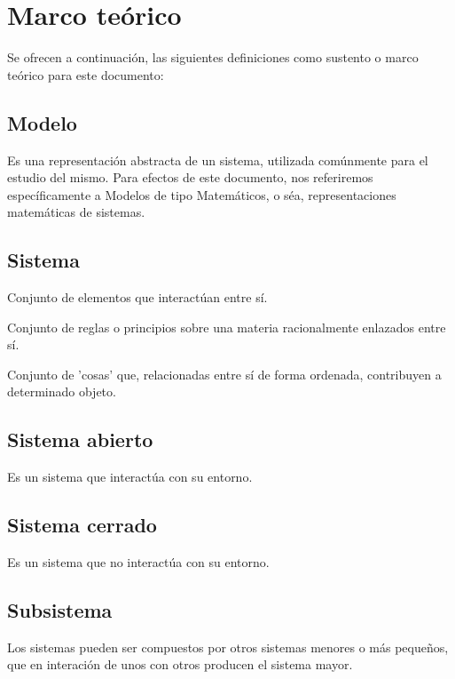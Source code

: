 \section{Marco teórico}
Se ofrecen a continuación, las siguientes definiciones como sustento o marco teórico para este documento:


\subsection{Modelo}
Es una representación abstracta de un sistema, utilizada comúnmente para el estudio del mismo. Para efectos de este documento, nos referiremos específicamente a Modelos de tipo Matemáticos, o séa, representaciones matemáticas de sistemas.


\subsection{Sistema}
Conjunto de elementos que interactúan entre sí.

Conjunto de reglas o principios sobre una materia racionalmente enlazados entre sí.

Conjunto de 'cosas' que, relacionadas entre sí de forma ordenada, contribuyen a determinado objeto.


\subsection{Sistema abierto}
Es un sistema que interactúa con su entorno.


\subsection{Sistema cerrado}
Es un sistema que no interactúa con su entorno.


\subsection{Subsistema}
Los sistemas pueden ser compuestos por otros sistemas menores o más pequeños, que en interación de unos con otros producen el sistema mayor.

